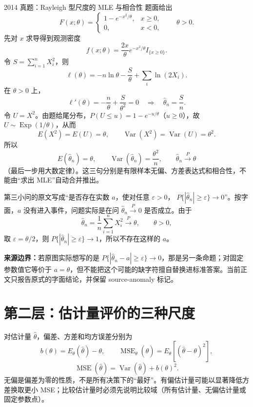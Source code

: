 \documentclass[11pt,a4paper]{ctexart}
\begin{document}
\begin{examplebox}{2014 真题：Rayleigh 型尺度的 MLE 与相合性}
题面给出
\[
F(x;\theta)=\begin{cases}1-e^{-x^2/\theta},&x\ge0,\\0,&x<0,\end{cases}
\qquad \theta>0.
\]
先对 $x$ 求导得到观测密度
\[
f(x;\theta)=\frac{2x}{\theta}e^{-x^2/\theta}I_{\{x\ge0\}}.
\]
令 $S=\sum_{i=1}^nX_i^2$，则
\[
\ell(\theta)=-n\ln\theta-\frac{S}{\theta}+\sum_i\ln(2X_i).
\]
在 $\theta>0$ 上，
\[
\ell'(\theta)=-\frac n\theta+\frac S{\theta^2}=0
\quad\Longrightarrow\quad
\widehat\theta_n=\frac Sn.
\]
令 $U=X^2$。由题给尾分布，$P(U\le u)=1-e^{-u/\theta}$（$u\ge0$），故
$U\sim\operatorname{Exp}(1/\theta)$，从而
\[
E(X^2)=E(U)=\theta,\qquad \operatorname{Var}(X^2)=\operatorname{Var}(U)=\theta^2.
\]
所以
\[
E(\widehat\theta_n)=\theta,\qquad
\operatorname{Var}(\widehat\theta_n)=\frac{\theta^2}{n},
\qquad \widehat\theta_n\xrightarrow{P}\theta
\]
（最后一步用大数定律）。这三句分别是有限样本无偏、方差表达式和相合性，不能由“求出 MLE”自动合并推出。

第三小问的原文写成“是否存在实数 $a$，使对任意 $\varepsilon>0$，
$P\{|\widehat\theta_n|\ge\varepsilon\}\to0$”。按字面，$a$ 没有进入事件，问题实际是在问 $\widehat\theta_n\xrightarrow{P}0$ 是否成立。由于
\[
\widehat\theta_n=\frac1n\sum_{i=1}^nX_i^2\xrightarrow{P}\theta,
\qquad \theta>0,
\]
取 $\varepsilon=\theta/2$，则 $P\{|\widehat\theta_n|\ge\varepsilon\}\to1$，所以不存在这样的 $a$。

\textbf{来源边界：}若原图实际想写的是 $P\{|\widehat\theta_n-a|\ge\varepsilon\}\to0$，那是另一条命题；对固定参数值它等价于 $a=\theta$，但不能把这个可能的缺字符擅自替换进标准答案。当前正文只报告原式的字面结论，并保留 source-anomaly 标记。
\end{examplebox}

\section{第二层：估计量评价的三种尺度}

对估计量 $\widehat\theta$，偏差、方差和均方误差分别为
\[
b(\theta)=E_\theta(\widehat\theta)-\theta,
\qquad
\operatorname{MSE}_\theta(\widehat\theta)=E_\theta[(\widehat\theta-\theta)^2],
\]
\[
\boxed{\operatorname{MSE}(\widehat\theta)=\operatorname{Var}(\widehat\theta)+b(\theta)^2}.
\]
无偏是偏差为零的性质，不是所有决策下的“最好”。有偏估计量可能以显著降低方差换取更小 MSE；比较估计量时必须先说明比较域（所有估计量、无偏估计量或固定参数点）。
\end{document}
